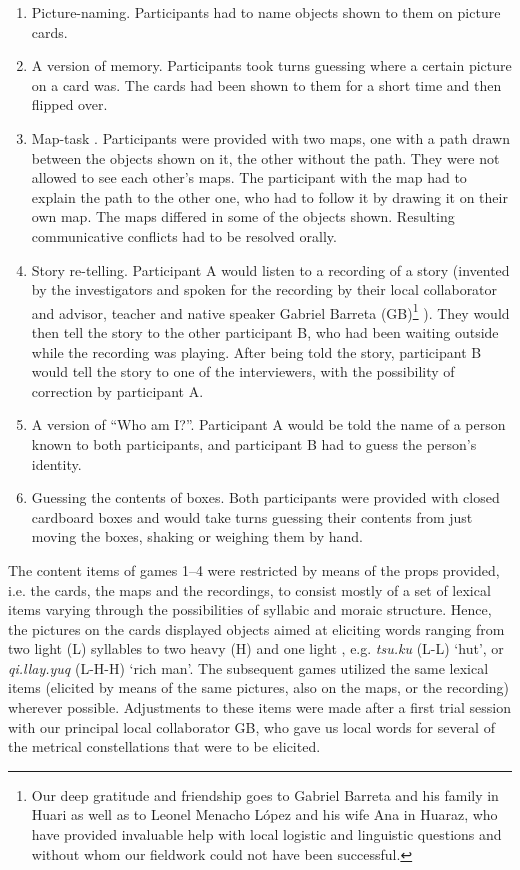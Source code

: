 \documentclass[output=paper]{LSP/langsci}
\begin{document}
\begin{enumerate}
\item {Picture-naming}. Participants had to name objects shown to them on picture cards.

\item {A version of memory}. Participants took turns guessing where a certain picture on a card was. The cards had been shown to them for a short time and then flipped over. 

\item {Map-task} \citep{Anderson1991}. Participants were provided with two maps, one with a path drawn between the objects shown on it, the other without the path. They were not allowed to see each other’s maps. The participant with the map had to explain the path to the other one, who had to follow it by drawing it on their own map. The maps differed in some of the objects shown. Resulting communicative conflicts had to be resolved orally.  

\item {Story re-telling}. Participant A would listen to a recording of a story (invented by the investigators and spoken for the recording by their local collaborator and advisor,  teacher and native speaker Gabriel Barreta (GB)\footnote{Our deep gratitude and friendship goes to Gabriel Barreta and his family in Huari as well as to Leonel Menacho López and his wife Ana in Huaraz, who have provided invaluable help with local logistic and linguistic questions and without whom our fieldwork could not have been successful.} ). They would then tell the story to the other participant B, who had been waiting outside while the recording was playing. After being told the story, participant B would tell the story to one of the interviewers, with the possibility of correction by participant A. 

\item {A version of “Who am I?”}. Participant A would be told the name of a person known to both participants, and participant B had to guess the person’s identity.

\item {Guessing the contents of boxes}. Both participants were provided with closed cardboard boxes and would take turns guessing their contents from just moving the boxes, shaking or weighing them by hand. 
\end{enumerate}


The content items of games 1--4 were restricted by means of the props provided, i.e. the cards, the maps and the recordings, to consist mostly of a set of lexical items varying through the possibilities of  syllabic and moraic structure. Hence, the pictures on the cards displayed objects aimed at eliciting words ranging from two light (L) syllables to two heavy (H) and one light , e.g. \textit{tsu.ku} (L-L) `hut', or \textit{qi.llay.yuq} (L-H-H) `rich man'. The subsequent games utilized the same lexical items (elicited by means of the same pictures, also on the maps, or the recording) wherever possible. Adjustments to these items were made after a first trial session with our principal local collaborator GB, who gave us local words for several of the metrical constellations that were to be elicited. 
\end{document}
